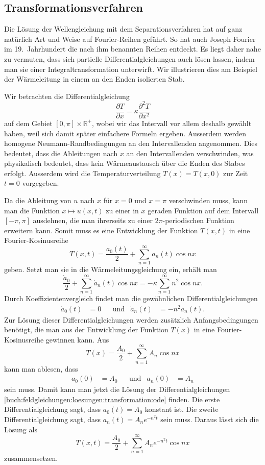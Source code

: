 \subsection{Transformationsverfahren}
%
Die Lösung der Wellengleichung mit dem Separationsverfahren hat 
auf ganz natürlich Art und Weise auf Fourier-Reihen geführt.
So hat auch Joseph Fourier im 19.~Jahrhundert die nach ihm benannten
Reihen entdeckt.
Es liegt daher nahe zu vermuten, dass sich partielle Differentialgleichungen
auch lösen lassen, indem man sie einer Integraltransformation
unterwirft.
Wir illustrieren dies am Beispiel der Wärmeleitung in einem 
an den Enden isolierten Stab.

Wir betrachten die Differentialgleichung
\[
\frac{\partial T}{\partial x}
=
\kappa
\frac{\partial^2 T}{\partial x^2}
\]
auf dem Gebiet $[0,\pi]\times\mathbb{R}^+$, wobei wir das Intervall
vor allem deshalb gewählt haben, weil sich damit später einfachere
Formeln ergeben.
Ausserdem werden homogene Neumann-Randbedingungen an den
Intervallenden angenommen.
Dies bedeutet, dass die Ableitungen nach $x$ an den Intervallenden
verschwinden, was physikalisch bedeutet, dass kein Wärmeaustausch
über die Enden des Stabes erfolgt.
Ausserdem wird die Temperaturverteilung $T(x)=T(x,0)$ zur Zeit $t=0$
vorgegeben.

Da die Ableitung von $u$ nach $x$ für $x=0$ und $x=\pi$ verschwinden
muss, kann man die Funktion $x\mapsto u(x,t)$ zu einer in $x$
geraden Funktion auf dem Intervall $[-\pi,\pi]$ ausdehnen, die
man ihrerseits zu einer $2\pi$-periodischen Funktion erweitern kann.
Somit muss es eine Entwicklung der Funktion $T(x,t)$ in
eine Fourier-Kosinusreihe
\[
T(x,t)
=
\frac{a_0(t)}{2}
+
\sum_{n=1}^\infty
a_n(t) \cos nx
\]
geben.
Setzt man sie in die Wärmeleitungsgleichung ein, erhält man
\[
\frac{\dot{a}_0}{2}
+
\sum_{n=1}^\infty
\dot{a}_n(t) \cos nx
=
-
\kappa
\sum_{n=1}^\infty
n^2
\cos nx.
\]
Durch Koeffizientenvergleich findet man die gewöhnlichen
Differentialgleichungen
\begin{align}
\dot{a}_0(t)&=0
&&\text{und}&
\dot{a}_n(t)&=-n^2 a_n(t).
\label{buch:feldgleichungen:loesungen:transformation:ode}
\end{align}
Zur Lösung dieser Differentialgleichungen werden zusätzlich
Anfangsbedingungen benötigt, die man aus der Entwicklung der
Funktion $T(x)$ in eine Fourier-Kosinusreihe gewinnen kann.
%
Aus 
\[
T(x)
=
\frac{A_0}2
+
\sum_{n=1}^\infty A_n \cos nx
\]
kann man ablesen, dass
\begin{align*}
a_0(0) &= A_0
&&\text{und}&
a_n(0) &= A_n
\end{align*}
sein muss.
Damit kann man jetzt die Lösung der Differentialgleichungen
\eqref{buch:feldgleichungen:loesungen:transformation:ode}
finden.
Die erste Differentialgleichung sagt, dass $a_0(t)=A_0$ konstant ist.
Die zweite Differentialgleichung sagt, dass $a_n(t) = A_ne^{-n^2t}$
sein muss.
Daraus lässt sich die Lösung als
\[
T(x,t)
=
\frac{A_0}{2}
+
\sum_{n=1}^\infty
A_n
e^{-n^2t}
\cos nx
\]
zusammensetzen.

